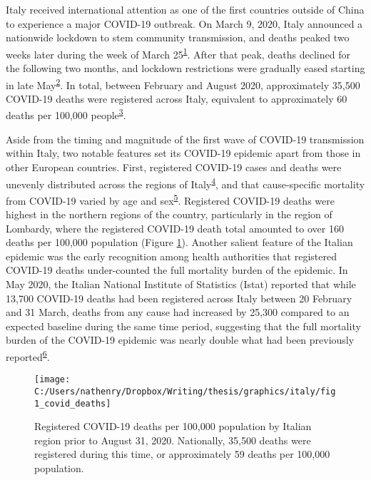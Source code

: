 \documentclass[
]{article}
\begin{document}
Italy received international attention as one of the first countries outside of China to experience a major COVID-19 outbreak. On March 9, 2020, Italy announced a nationwide lockdown to stem community transmission, and deaths peaked two weeks later during the week of March 25\textsuperscript{\protect\hyperlink{ref-Sebastiani2020}{1}}⁠. After that peak, deaths declined for the following two months, and lockdown restrictions were gradually eased starting in late May\textsuperscript{\protect\hyperlink{ref-Alicandro2020}{2}}⁠. In total, between February and August 2020, approximately 35,500 COVID-19 deaths were registered across Italy, equivalent to approximately 60 deaths per 100,000 people\textsuperscript{\protect\hyperlink{ref-InstituteforHealthMetricsandEvaluationIHME2020}{3}}.

Aside from the timing and magnitude of the first wave of COVID-19 transmission within Italy, two notable features set its COVID-19 epidemic apart from those in other European countries. First, registered COVID-19 cases and deaths were unevenly distributed across the regions of Italy\textsuperscript{\protect\hyperlink{ref-LaMaestra2020}{4}}⁠, and that cause-specific mortality from COVID-19 varied by age and sex\textsuperscript{\protect\hyperlink{ref-Albitar2020}{5}}⁠. Registered COVID-19 deaths were highest in the northern regions of the country, particularly in the region of Lombardy, where the registered COVID-19 death total amounted to over 160 deaths per 100,000 population (Figure \ref{fig:covid-deaths}). Another salient feature of the Italian epidemic was the early recognition among health authorities that registered COVID-19 deaths under-counted the full mortality burden of the epidemic. In May 2020, the Italian National Institute of Statistics (Istat) reported that while 13,700 COVID-19 deaths had been registered across Italy between 20 February and 31 March, deaths from any cause had increased by 25,300 compared to an expected baseline during the same time period, suggesting that the full mortality burden of the COVID-19 epidemic was nearly double what had been previously reported\textsuperscript{\protect\hyperlink{ref-Mannucci2020}{6}}.

\begin{figure}[!hbt]

{\centering \texttt{[image: C:/Users/nathenry/Dropbox/Writing/thesis/graphics/italy/fig1\_covid\_deaths]} 

}

\caption{Registered COVID-19 deaths per 100,000 population by Italian region prior to August 31, 2020. Nationally, 35,500 deaths were registered during this time, or approximately 59 deaths per 100,000 population.}\label{fig:covid-deaths}
\end{figure}
\end{document}
